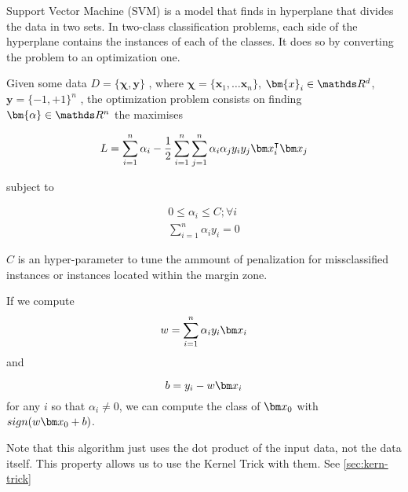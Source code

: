   \begin{pre-delivery}
    Support Vector Machine (SVM) is a model that finds in hyperplane that
    divides the data in two sets. In two-class classification problems, each
    side of the hyperplane contains the instances of each of the classes.
    It does so by converting the problem to an optimization one.

    Given some data
    $D = \{\bm{\chi}, \bm{y}\}$
    , where
    $\bm{\chi} = \{\bm{x}_1, \ldots \bm{x}_n\}$, $\bm{x}_i \in \reals^d$, $\bm{y} = \{-1, +1\}^n$
    , the optimization problem consists on finding $\bm{\alpha} \in \reals^n$
    the maximises

\begin{equation}
  L = \sum_{i = 1}^n\alpha_i -\frac{1}{2}\sum_{i = 1}^n\sum_{j = 1}^n\alpha_i\alpha_jy_iy_j\vx_i^\transp\vx_j
\end{equation}

subject to

\begin{align}
  0 \leq \alpha_i \leq C; \forall i\\
  \sum_{i = 1}^n \alpha_iy_i = 0
\end{align}


$C$ is an hyper-parameter to tune the ammount of penalization for missclassified
instances or instances located within the margin zone.

If we compute
\begin{equation}
  w = \sum_{i = 1}^n\alpha_iy_i\vx_i
\end{equation}
and

\begin{equation}
  b = y_i - w\vx_i
\end{equation}
for any $i$ so that $\alpha_i \neq 0$, we can compute the class of $\vx_0$ with
$sign(w\vx_0 + b)$.

Note that this algorithm just uses the dot product of the input data, not the
data itself. This property allows us to use the Kernel Trick with them.
See \ref{sec:kern-trick}

\end{pre-delivery}


